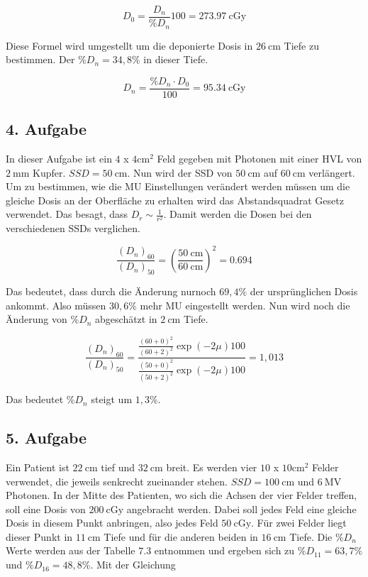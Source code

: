 \begin{equation*}
  D_0 = \frac{D_n}{\%D_n} 100 = \SI{273.97}{\centi\gray}
\end{equation*}

Diese Formel wird umgestellt um die deponierte Dosis in
$\SI{26}{\centi\meter}$ Tiefe zu bestimmen. Der $\%D_n=34,8\%$ in dieser Tiefe.

\begin{equation*}
  D_n = \frac{\%D_n \cdot D_0}{100} = \SI{95,34}{\centi\gray}
\end{equation*}

\subsection*{4. Aufgabe}

In dieser Aufgabe ist ein $4$ x $4 \si{\centi\meter\squared}$ Feld
gegeben mit Photonen mit einer HVL von $\SI{2}{\milli\meter}$ Kupfer.
$SSD=\SI{50}{\centi\meter}$. Nun wird der SSD von $\SI{50}{\centi\meter}$
auf $\SI{60}{\centi\meter}$ verlängert. Um zu bestimmen, wie die MU
Einstellungen verändert werden müssen um die gleiche Dosis an der Oberfläche
zu erhalten wird das Abstandsquadrat Gesetz verwendet. Das besagt, dass
$D_r \sim \frac{1}{r^2}$. Damit werden die Dosen bei den verschiedenen
SSDs verglichen.

\begin{equation*}
  \frac{(D_n)_{60}}{(D_n)_{50}} = \left(\frac{\SI{50}{\centi\meter}}{\SI{60}{\centi\meter}} \right)^2 = \num{0.694}
\end{equation*}

Das bedeutet, dass durch die Änderung nurnoch $69,4\%$ der ursprünglichen
Dosis ankommt. Also müssen $30,6\%$ mehr MU eingestellt werden.
Nun wird noch die Änderung von $\%D_n$ abgeschätzt in $\SI{2}{\centi\meter}$
Tiefe.

\begin{equation*}
  \frac{(D_n)_{60}}{(D_n)_{50}} = \frac{\frac{(60+0)^2}{(60+2)^2}\exp(-2\mu)100}{\frac{(50+0)^2}{(50+2)^2}\exp(-2\mu)100} = 1,013
\end{equation*}

Das bedeutet $\%D_n$ steigt um $1,3\%$.

\subsection*{5. Aufgabe}

Ein Patient ist $\SI{22}{\centi\meter}$ tief und $\SI{32}{\centi\meter}$
breit. Es werden vier $10$ x $10 \si{\centi\meter\squared}$ Felder
verwendet, die jeweils senkrecht zueinander stehen.
$SSD=\SI{100}{\centi\meter}$ und $\SI{6}{\mega\volt}$ Photonen. In der
Mitte des Patienten, wo sich die Achsen der vier Felder treffen, soll eine
Dosis von $\SI{200}{\centi\gray}$ angebracht werden. Dabei soll jedes Feld
eine gleiche Dosis in diesem Punkt anbringen, also jedes Feld
$\SI{50}{\centi\gray}$. Für zwei Felder liegt dieser Punkt in
$\SI{11}{\centi\meter}$ Tiefe und für die anderen beiden in
$\SI{16}{\centi\meter}$ Tiefe. Die $\%D_n$ Werte werden aus der Tabelle $7.3$
entnommen und ergeben sich zu $\%D_{11} = 63,7\%$ und $\%D_{16} = 48,8\%$.
Mit der Gleichung

